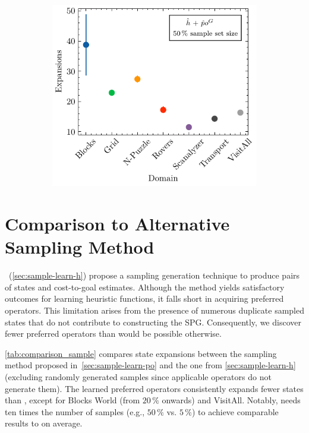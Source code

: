 \documentclass[ppgc,diss,english]{iiufrgs}
\begin{document}
\begin{figure}[tb]
  \vspace{0.5cm}

  \begin{subfigure}{0.41\textwidth}
    \centering
    \includegraphics[width=\linewidth]{img/error_hNN_poG_50pct.pdf}
  \end{subfigure}
  \label{fig:errors}
\end{figure}


\section{Comparison to Alternative Sampling Method}
\label{sec:exp-comparison-sample-method}
\citet{Bettker.etal/2022}~(\cref{sec:sample-learn-h}) propose a sampling generation technique to produce pairs of states and cost-to-goal estimates. Although the method yields satisfactory outcomes for learning heuristic functions, it falls short in acquiring preferred operators.
This limitation arises from the presence of numerous duplicate sampled states that do not contribute to constructing the SPG. Consequently, we discover fewer preferred operators than would be possible otherwise.

\cref{tab:comparison_sample} compares state expansions between the sampling method proposed in~\cref{sec:sample-learn-po} \pog and the one from \cref{sec:sample-learn-h} \pofsm (excluding randomly generated samples since applicable operators do not generate them). The learned preferred operators \pog consistently expands fewer states than \pofsm, except for Blocks World (from $20\,\%$ onwards) and VisitAll. Notably, \pofsm needs ten times the number of samples (e.g., $50\,\%$ vs. $5\,\%$) to achieve comparable results to \pog on average.
\end{document}
